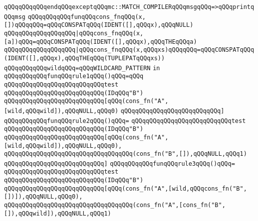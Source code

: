 \verb|qQQqqQQqqQQqendqQQqexceptqQQqmc::MATCH_COMPILERqQQqmsgqQQq=>qQQqprintqQQqmsg|\newline
\newline
\verb|qQQqqQQqqQQqfunqQQqcons_fnqQQq(x,[])qQQqqQQq=qQQqCONSPATqQQq(IDENT([],qQQqx),qQQqNULL)|\newline
\verb|qQQqqQQqqQQqqQQqqQQq|\verb#|qQQqcons_fnqQQq(x,[a])qQQq=qQQqCONSPATqQQq(IDENT([],qQQqx),qQQqTHEqQQqa)#\newline
\verb|qQQqqQQqqQQqqQQqqQQq|\verb#|qQQqcons_fnqQQq(x,qQQqxs)qQQqqQQq=qQQqCONSPATqQQq(IDENT([],qQQqx),qQQqTHEqQQq(TUPLEPATqQQqxs))#\newline
\newline
\verb|qQQqqQQqqQQqwildqQQq=qQQqWILDCARD_PATTERN|\newline
\newline
\verb|in|\newline
\newline
\verb|qQQqqQQqqQQqfunqQQqrule1qQQq()qQQq=qQQq|\newline
\verb|qQQqqQQqqQQqqQQqqQQqqQQqqQQqtest|\newline
\verb|qQQqqQQqqQQqqQQqqQQqqQQqqQQq(IDqQQq"B")|\newline
\verb|qQQqqQQqqQQqqQQqqQQqqQQqqQQq[qQQq(cons_fn("A",[wild,qQQqwild]),qQQqNULL,qQQq0)|\newline
\verb|qQQqqQQqqQQqqQQqqQQqqQQqqQQq]|\newline
\newline
\verb|qQQqqQQqqQQqfunqQQqrule2qQQq()qQQq=|\newline
\verb|qQQqqQQqqQQqqQQqqQQqqQQqqQQqtest|\newline
\verb|qQQqqQQqqQQqqQQqqQQqqQQqqQQq(IDqQQq"B")|\newline
\verb|qQQqqQQqqQQqqQQqqQQqqQQqqQQq[qQQq(cons_fn("A",[wild,qQQqwild]),qQQqNULL,qQQq0),|\newline
\verb|qQQqqQQqqQQqqQQqqQQqqQQqqQQqqQQqqQQq(cons_fn("B",[]),qQQqNULL,qQQq1)|\newline
\verb|qQQqqQQqqQQqqQQqqQQqqQQqqQQq]|\newline
\newline
\verb|qQQqqQQqqQQqfunqQQqrule3qQQq()qQQq=|\newline
\verb|qQQqqQQqqQQqqQQqqQQqqQQqqQQqtest|\newline
\verb|qQQqqQQqqQQqqQQqqQQqqQQqqQQq(IDqQQq"B")|\newline
\verb|qQQqqQQqqQQqqQQqqQQqqQQqqQQq[qQQq(cons_fn("A",[wild,qQQqcons_fn("B",[])]),qQQqNULL,qQQq0),|\newline
\verb|qQQqqQQqqQQqqQQqqQQqqQQqqQQqqQQqqQQq(cons_fn("A",[cons_fn("B",[]),qQQqwild]),qQQqNULL,qQQq1)|\newline
